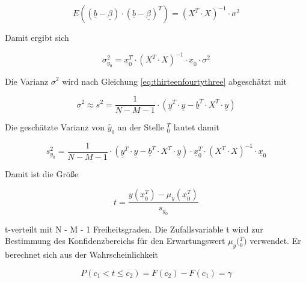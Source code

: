 \begin{equation}\label{eq:thirteensixtyone}
E\left(\left(\underline{b}-\underline{\beta }\right)\cdot \left(\underline{b}-\underline{\beta }\right)^{T} \right)=\left(X^{T} \cdot X\right)^{-1} \cdot \sigma ^{2}
\end{equation}

\noindent Damit ergibt sich 

\begin{equation}\label{eq:thirteensixtytwo}
\sigma _{y_{0} }^{2} =\underline{x}_{0}^{T} \cdot \left(X^{T} \cdot X\right)^{-1} \cdot \underline{x}_{0} \cdot \sigma ^{2} 
\end{equation}

\noindent Die Varianz $\sigma^{2}$ wird nach Gleichung \eqref{eq:thirteenfourtythree} abgesch\"{a}tzt mit

\begin{equation}\label{eq:thirteensixtythree}
\sigma ^{2} \approx s^{2} =\frac{1}{N-M-1} \cdot \left(\underline{y}^{T} \cdot \underline{y}-\underline{b}^{T} \cdot X^{T} \cdot \underline{y}\right)
\end{equation}

\noindent Die gesch\"{a}tzte Varianz von $\widehat{y}_0$ an der Stelle $_{0}^{T}$ lautet damit

\begin{equation}\label{eq:thirteensixtyfour}
s_{y_{0} }^{2} =\frac{1}{N-M-1} \cdot \left(\underline{y}^{T} \cdot \underline{y}-\underline{b}^{T} \cdot X^{T} \cdot \underline{y}\right)\cdot \underline{x}_{0}^{T} \cdot \left(X^{T} \cdot X\right)^{-1} \cdot \underline{x}_{0}
\end{equation}

\noindent Damit ist die Gr\"{o}{\ss}e 

\begin{equation}\label{eq:thirteensixtyfive}
t=\frac{y\left(\underline{x}_{0}^{T} \right)-\mu _{y} \left(\underline{x}_{0}^{T} \right)}{s_{y_{0}}}
\end{equation}

\noindent t-verteilt mit N - M - 1 Freiheitsgraden. Die Zufallsvariable t wird zur Bestimmung des Konfidenzbereichs f\"{u}r den Erwartungswert $\mu_{y}($$_{0}^{T})$ verwendet. Er berechnet sich aus der Wahrscheinlichkeit

\begin{equation}\label{eq:thirteensixtysix}
P(c_{1} <t\le c_{2})=F(c_{2})-F(c_{1})=\gamma 
\end{equation}

